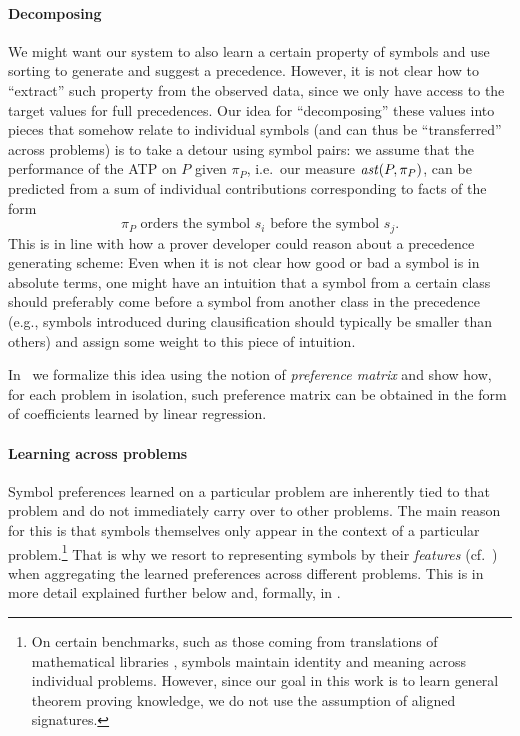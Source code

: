 \documentclass{ceurart}
\begin{document}
\paragraph{Decomposing}

We might want our system to also learn a certain property of symbols and use sorting to generate and suggest a precedence. 
However, it is not clear how to ``extract'' such property from the observed data, since we only have 
access to the target values for full precedences. Our idea for ``decomposing'' these values into pieces 
that somehow relate to individual symbols (and can thus be ``transferred'' across problems) is to take a detour using symbol pairs:
we assume that the performance of the ATP on \(P\) given \(\pi_P\), i.e.~our measure $\operatorname{\mathit{ast}}(P,\pi_P)$, can be predicted 
from a sum of individual contributions corresponding to facts of the form 
\[\pi_P\text{ orders the symbol }s_i\text{ before the symbol }s_j.\]
This is in line with how a prover developer could reason about a precedence generating scheme:
Even when it is not clear how good or bad a symbol is in absolute terms,
one might have an intuition that a symbol from a certain class should preferably 
come before a symbol from another class in the precedence  
(e.g., symbols introduced during clausification should typically be smaller than others)
and assign some weight to this piece of intuition. 

In~ we formalize this idea using the notion of \emph{preference matrix}
and show how, for each problem in isolation, such preference matrix can be obtained in the form of coefficients learned by linear regression.

\paragraph{Learning across problems}
Symbol preferences learned on a particular problem are inherently tied to that problem
and do not immediately carry over to other problems. The main reason for this 
is that symbols themselves only appear in the context of a particular problem.\footnote{On certain benchmarks, such as those coming from translations of mathematical libraries \cite{KaliszykU13b},
symbols maintain identity and meaning across individual problems. However, since our goal in this work
is to learn general theorem proving knowledge, we do not use the assumption of aligned signatures.}
That is why we resort to representing symbols by their \emph{features} (cf.~)
when aggregating the learned preferences across different problems.
This is in more detail explained further below and, formally, in .
\end{document}

